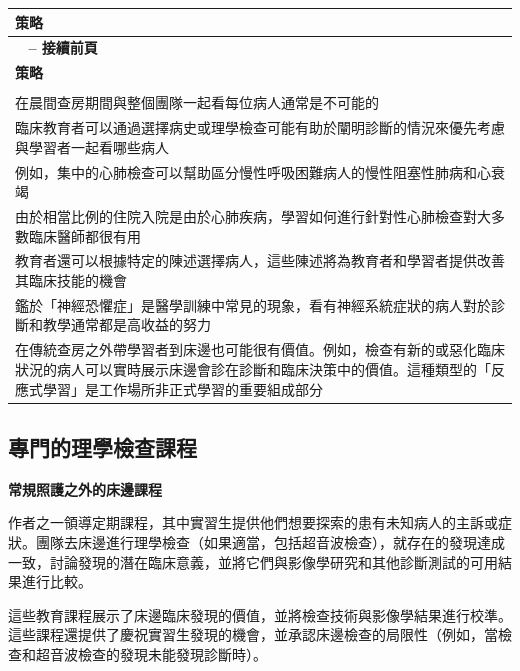 \documentclass[12pt,a4paper]{article}
\begin{document}
\begin{longtable}{>{\raggedright\arraybackslash}p{15cm}}
\toprule
\textbf{\textcolor{emergency_blue}{策略}} \\
\midrule
\endfirsthead

\multicolumn{1}{c}%
{{\bfseries \tablename\ \thetable{} -- 接續前頁}} \\
\toprule
\textbf{\textcolor{emergency_blue}{策略}} \\
\midrule
\endhead

\midrule \multicolumn{1}{r}{{接續下頁}} \\ \midrule
\endfoot

\bottomrule
\endlastfoot

在晨間查房期間與整個團隊一起看每位病人通常是不可能的 \\

臨床教育者可以通過選擇病史或理學檢查可能有助於闡明診斷的情況來優先考慮與學習者一起看哪些病人 \\

例如，集中的心肺檢查可以幫助區分慢性呼吸困難病人的慢性阻塞性肺病和心衰竭 \\

由於相當比例的住院入院是由於心肺疾病，學習如何進行針對性心肺檢查對大多數臨床醫師都很有用 \\

教育者還可以根據特定的陳述選擇病人，這些陳述將為教育者和學習者提供改善其臨床技能的機會 \\

鑑於「神經恐懼症」是醫學訓練中常見的現象，看有神經系統症狀的病人對於診斷和教學通常都是高收益的努力 \\

在傳統查房之外帶學習者到床邊也可能很有價值。例如，檢查有新的或惡化臨床狀況的病人可以實時展示床邊會診在診斷和臨床決策中的價值。這種類型的「反應式學習」是工作場所非正式學習的重要組成部分 \\
\end{longtable}

\subsection{專門的理學檢查課程}

\begin{importantbox}
\textbf{常規照護之外的床邊課程}

作者之一領導定期課程，其中實習生提供他們想要探索的患有未知病人的主訴或症狀。團隊去床邊進行理學檢查（如果適當，包括超音波檢查），就存在的發現達成一致，討論發現的潛在臨床意義，並將它們與影像學研究和其他診斷測試的可用結果進行比較。

這些教育課程展示了床邊臨床發現的價值，並將檢查技術與影像學結果進行校準。這些課程還提供了慶祝實習生發現的機會，並承認床邊檢查的局限性（例如，當檢查和超音波檢查的發現未能發現診斷時）。
\end{importantbox}
\end{document}
